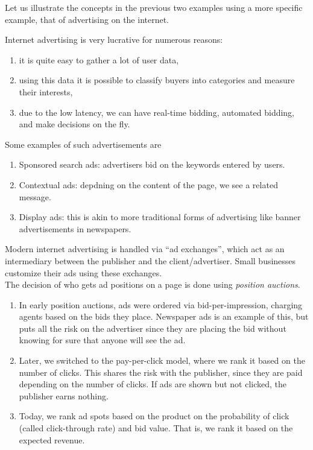 		Let us illustrate the concepts in the previous two examples using a more specific example, that of advertising on the internet.

		\begin{fex}
			Internet advertising is very lucrative for numerous reasons: 
			\begin{enumerate}
				\item it is quite easy to gather a lot of user data,
				\item using this data it is possible to classify buyers into categories and measure their interests,
				\item due to the low latency, we can have real-time bidding, automated bidding, and make decisions on the fly.
			\end{enumerate}
			Some examples of such advertisements are
			\begin{enumerate}
				\item Sponsored search ads: advertisers bid on the keywords entered by users.
				\item Contextual ads: depdning on the content of the page, we see a related message.
				\item Display ads: this is akin to more traditional forms of advertising like banner advertisements in newspapers.
			\end{enumerate}
			Modern internet advertising is handled via ``ad exchanges'', which act as an intermediary between the publisher and the client/advertiser. Small businesses customize their ads using these exchanges.\\
			The decision of who gets ad positions on a page is done using \emph{position auctions}.
			\begin{enumerate}
				\item In early position auctions, ads were ordered via bid-per-impression, charging agents based on the bids they place. Newspaper ads is an example of this, but puts all the risk on the advertiser since they are placing the bid without knowing for sure that anyone will see the ad.
				\item Later, we switched to the pay-per-click model, where we rank it based on the number of clicks. This shares the risk with the publisher, since they are paid depending on the number of clicks. If ads are shown but not clicked, the publisher earns nothing.
				\item Today, we rank ad spots based on the product on the probability of click (called click-through rate) and bid value. That is, we rank it based on the expected revenue.
			\end{enumerate}
		\end{fex}

